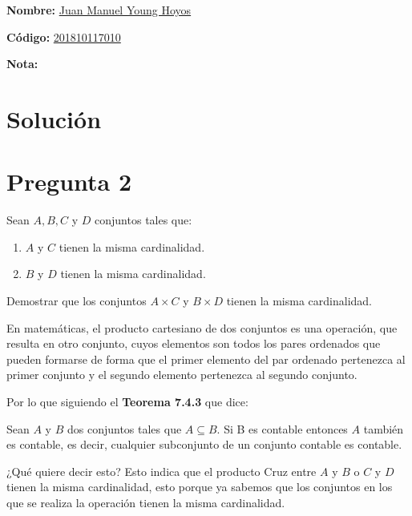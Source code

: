 \documentclass{exam}
\begin{document}
\begin{center}
\end{center}

\textbf{Nombre:} \underline{Juan Manuel Young Hoyos} \enspace\hrulefill

\textbf{Código:} \underline{201810117010} \enspace\hrulefill

\textbf{Nota:\enspace\hrulefill}

    \section*{Solución}

    \section*{Pregunta 2}

    Sean $A, B, C$ y $D$ conjuntos tales que:
    
    \begin{enumerate}
        \item $A$ y $C$ tienen la misma cardinalidad.
        \item $B$ y $D$ tienen la misma cardinalidad.
    \end{enumerate}
    
    Demostrar que los conjuntos $A \times C$ y $B \times D$ tienen la misma cardinalidad. \newline

    En matemáticas, el producto cartesiano de dos conjuntos es una operación,
    que resulta en otro conjunto, cuyos elementos son todos los pares ordenados 
    que pueden formarse de forma que el primer elemento del par ordenado pertenezca
    al primer conjunto y el segundo elemento pertenezca al segundo conjunto. \newline

    Por lo que siguiendo el \textbf{Teorema 7.4.3} que dice: \newline

    Sean $A$ y $B$ dos conjuntos tales que $A \subseteq B$. Si B es contable entonces $A$
    también es contable, es decir, cualquier subconjunto de un conjunto contable
    es contable. \newline

    ¿Qué quiere decir esto? Esto indica que el producto Cruz entre $A$ y $B$ o $C$ y $D$ tienen
    la misma cardinalidad, esto porque ya sabemos que los conjuntos en los que se realiza la
    operación tienen la misma cardinalidad.
\end{document}
